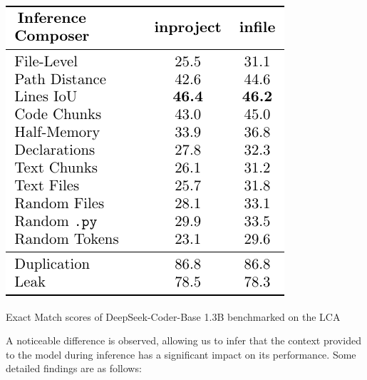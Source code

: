 \begin{table}[htbp]
    \centering
    \includegraphics{tables/rq-a1.pdf}
    \caption{Exact Match scores of DeepSeek-Coder-Base 1.3B benchmarked on the LCA}\label{tab:dseek-inference}
\end{table}

A noticeable difference is observed, allowing us to infer that the context provided to the model during inference has a significant impact on its performance. Some detailed findings are as follows:

